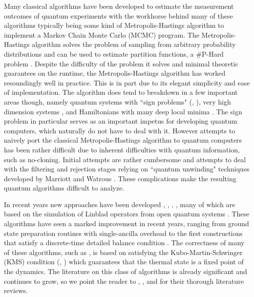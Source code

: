 Many classical algorithms have been developed to estimate the measurement outcomes of quantum experiments with the workhorse behind many of these algorithms typically being some kind of Metropolis-Hastings algorithm \cite{metropolis1953equation} to implement a Markov Chain Monte Carlo (MCMC) program. The Metropolis-Hastings algorithm solves the problem of sampling from arbitrary probability distributions and can be used to estimate partition functions, a \#P-Hard problem \cite{roth1996hardness}. Despite the difficulty of the problem it solves and minimal theoretic guarantees on the runtime, the Metropolis-Hastings algorithm has worked resoundingly well in practice. This is in part due to its elegant simplicity and ease of implementation. The algorithm does tend to breakdown in a few important areas though, namely quantum systems with ``sign problems" (\cite{signProblemOG}, \cite{troyer2005sign}), very high dimension systems \cite{beskos2010optimaltuninghybridmontecarlo}, and Hamiltonians with many deep local minima \cite{betancourt2018conceptualintroductionhamiltonianmonte}. The sign problem in particular serves as an important impetus for developing quantum computers, which naturally do not have to deal with it. However attempts to naively port the classical Metropolis-Hastings algorithm to quantum computers has been rather difficult due to inherent difficulties with quantum information, such as no-cloning. Initial attempts \cite{temme2011} are rather cumbersome and attempts to deal with the filtering and rejection stages relying on ``quantum unwinding" techniques developed by Marriott and Watrous \cite{marriott2005quantum}. These complications make the resulting quantum algorithms difficult to analyze. 

In recent years new approaches have been developed \cite{chen2023quantumthermalstatepreparation}, \cite{gilyen2024quantumgeneralizationsglaubermetropolis}, \cite{motlagh2024ground}, \cite{motta2019} \cite{ding2024single}, many of which are based on the simulation of Linblad operators from open quantum systems \cite{davies1974markovian}. These algorithms have seen a marked improvement in recent years, ranging from ground state preparation routines with single-ancilla overhead \cite{ding2024single} to the first constructions that satisfy a discrete-time detailed balance condition \cite{gilyen2024quantumgeneralizationsglaubermetropolis}. The correctness of many of these algorithms, such as \cite{ding2024efficientquantumgibbssamplers}, is based on satisfying the Kubo-Martin-Schwinger (KMS) condition (\cite{kms2}, \cite{kms1}) which guarantees that the thermal state is a fixed point of the dynamics. The literature on this class of algorithms is already significant and continues to grow, so we point the reader to \cite{gilyen2024quantumgeneralizationsglaubermetropolis}, \cite{dalzell2023quantumalgorithmssurveyapplications}, \cite{chen2023quantumthermalstatepreparation} and \cite{rouze2024efficientthermalizationuniversalquantum} for their thorough literature reviews. 

